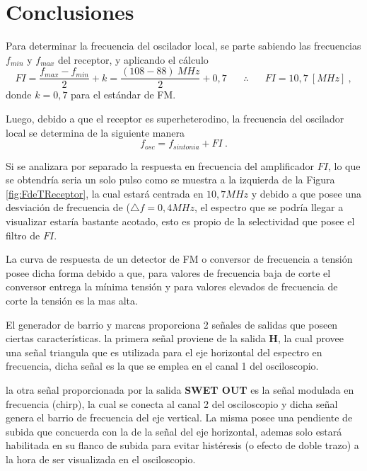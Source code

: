   \section{Conclusiones}

    Para determinar la frecuencia del oscilador local, se parte sabiendo las frecuencias 
    \(f_{min}\) y \(f_{max}\) del receptor, y
    aplicando el cálculo 
      \begin{equation*}
        FI = \dfrac{f_{max} - f_{min}}{2} + k = 
        \dfrac{(108 - 88)~MHz}{2} + 0,7 \hspace{20pt} \therefore \hspace{20pt} FI = 10,7~[MHz]~,
      \end{equation*}
    donde \(k = 0,7\) para el estándar de FM.
    
    Luego, debido a que el receptor es superheterodino, la frecuencia del oscilador local 
    se determina de la siguiente manera
      \begin{equation*}
        f_{osc} = f_{sintonia} +FI~.
      \end{equation*}

    Si se analizara por separado la respuesta en frecuencia del amplificador \(FI\), lo que
    se obtendría seria un solo pulso como se muestra a la izquierda de la Figura 
    \ref{fig:FdeTReceptor}, la cual estará centrada en \(10,7 MHz\) y debido a que 
    posee una desviación de frecuencia de (\(\triangle f = 0,4 MHz\), el espectro que
    se podría llegar a visualizar estaría bastante acotado, esto es propio de la 
    selectividad que posee el filtro de \(FI\).   
    
    La curva de respuesta de un detector de FM o conversor de frecuencia a tensión 
    posee dicha forma debido a que, para valores de frecuencia baja de corte el 
    conversor entrega la mínima tensión y para valores elevados de frecuencia de 
    corte la tensión es la mas alta.   
    
    El generador de barrio y marcas proporciona 2 señales de salidas que poseen ciertas
    características. la primera señal proviene de la salida \textbf{H}, la cual provee 
    una señal triangula que es utilizada para el eje horizontal del espectro en 
    frecuencia, dicha señal es la que se emplea en el canal 1 del osciloscopio. 

    la otra señal proporcionada por la salida  \textbf{SWET OUT} es la señal modulada en 
    frecuencia (chirp), la cual se conecta al canal 2 del osciloscopio y dicha señal
    genera el barrio de frecuencia del eje vertical. La misma posee una pendiente de 
    subida que concuerda con la de la señal del eje horizontal, ademas solo estará 
    habilitada en su flanco de subida para evitar histéresis (o efecto de doble trazo) 
    a la hora de ser visualizada en el osciloscopio.   
